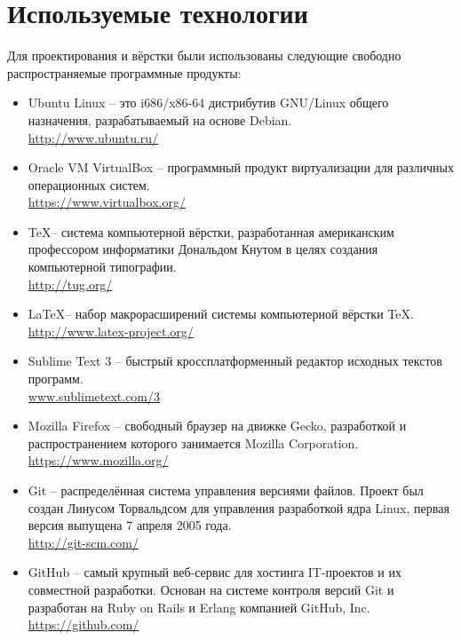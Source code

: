 \documentclass[a4paper, 14pt]{extreport}
\begin{document}
    \chapter{Используемые технологии}
    Для проектирования и вёрстки были использованы следующие свободно распространяемые программные 
    продукты:
    \begin{itemize}
        \item Ubuntu Linux -- это i686/x86-64 дистрибутив GNU/Linux общего 
            назначения, разрабатываемый на основе Debian.\\
            \url{http://www.ubuntu.ru/}
        \item Oracle VM VirtualBox -- программный продукт виртуализации для
            различных операционных систем.\\
            \url{https://www.virtualbox.org/}
        \item \TeX -- система компьютерной вёрстки, разработанная американским профессором информатики 
            Дональдом Кнутом в целях создания компьютерной типографии.\\
            \url{http://tug.org/}
        \item \LaTeX -- набор макрорасширений системы компьютерной вёрстки TeX.\\
            \url{http://www.latex-project.org/}
        \item Sublime Text 3 -- быстрый кроссплатформенный редактор исходных текстов программ.\\
            \url{www.sublimetext.com/3}
            
        \item Mozilla Firefox -- свободный браузер на движке Gecko, разработкой и распространением 
            которого занимается Mozilla Corporation.\\
            \url{https://www.mozilla.org/}
        \item Git -- распределённая система управления версиями файлов. Проект был создан Линусом 
            Торвальдсом для управления разработкой ядра Linux, первая версия выпущена 7 апреля 2005 года.\\
            \url{http://git-scm.com/}
        \item GitHub -- самый крупный веб-сервис для хостинга IT-проектов и их совместной разработки. 
            Основан на системе контроля версий Git и разработан на Ruby on Rails и Erlang компанией 
            GitHub, Inc.\\
            \url{https://github.com/}
    \end{itemize}
\end{document}
